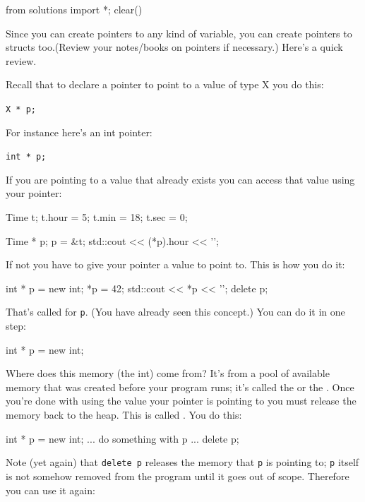 \begin{python0}
from solutions import *; clear()
\end{python0}

Since you can create pointers to any kind of variable, you can create
pointers to structs too.(Review your notes/books on pointers if
necessary.) Here's a quick review.

Recall that to declare a pointer to point to a value of type X you do this:

\verb!X * p;!

For instance here's an int pointer:

\verb!int * p;!

If you are pointing to a value that already exists you can access that
value using your pointer:

\begin{consolethree}[escapeinside=||]
Time t;
t.hour = 5;
t.min = 18;
t.sec = 0;

Time * p;
p = &t;
std::cout << (*p).hour << '\n';
\end{consolethree}

If not you have to give your pointer a value to point to. This is how you do
it:

\begin{consolethree}[escapeinside=||]
int * p = new int;
*p = 42;
std::cout << *p << '\n';
delete p;
\end{consolethree}

That's called  for \texttt{p}. (You have already
seen this concept.) You can do it in one step:

\begin{consolethree}[escapeinside=||]
int * p = new int;
\end{consolethree}

Where does this memory (the int) come from? It's from a pool of
available memory that was created before your program runs; it's called
the  or the . Once you're done with using the value your
pointer is pointing to you must release the memory back to the heap.
This is called . You do this:

\begin{consolethree}[escapeinside=||]
int * p = new int;
... do something with p ...
delete p;
\end{consolethree}

Note (yet again) that \texttt{delete p} releases the memory that \texttt{p} is pointing
to; \texttt{p} itself is not somehow removed from the program until it goes out of
scope. Therefore you can use it again:

